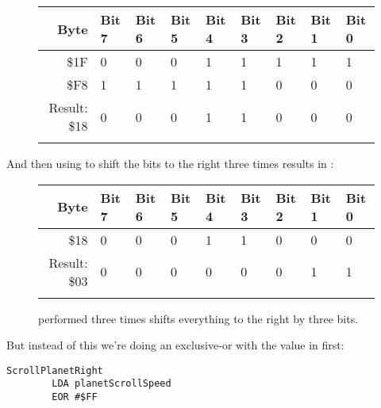 \begin{figure}[H]
  {
    \setlength{\tabcolsep}{3.0pt}
    \setlength\cmidrulewidth{\heavyrulewidth} %
    \begin{adjustbox}{width=6cm,center}

      \begin{tabular}{rllllllll}
        \toprule
        Byte & Bit 7 & Bit 6 & Bit 5 & Bit 4 & Bit 3 & Bit 2 & Bit 1 & Bit 0        \\
        \midrule
        \$1F & 0 & 0 & 0 & 1 & 1 & 1 & 1 & 1 \\
        \$F8 & 1 & 1 & 1 & 1 & 1 & 0 & 0 & 0 \\
        \midrule
        Result: \$18 & 0 & 0 & 0 & 1 & 1 & 0 & 0 & 0 \\
        \addlinespace
        \bottomrule
      \end{tabular}
    \end{adjustbox}
  }
\end{figure}

And then using  to shift the bits to the right three times results in :

\begin{figure}[H]
  {
    \setlength{\tabcolsep}{3.0pt}
    \setlength\cmidrulewidth{\heavyrulewidth} %
    \begin{adjustbox}{width=6cm,center}

      \begin{tabular}{rllllllll}
        \toprule
        Byte & Bit 7 & Bit 6 & Bit 5 & Bit 4 & Bit 3 & Bit 2 & Bit 1 & Bit 0        \\
        \midrule
        \$18 & 0 & 0 & 0 & 1 & 1 & 0 & 0 & 0 \\
        \midrule
        Result: \$03 & 0 & 0 & 0 & 0 & 0 & 0 & 1 & 1 \\
        \addlinespace
        \bottomrule
      \end{tabular}
    \end{adjustbox}
  }\caption{ performed three times shifts everything to the right by three bits.}
\end{figure}

But instead of this we're doing an exclusive-or with the value in  first:

\begin{lstlisting}
ScrollPlanetRight   
        LDA planetScrollSpeed
        EOR #$FF
\end{lstlisting}

